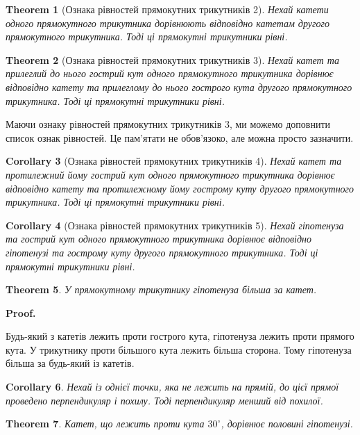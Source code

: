 \documentclass[a4paper, 10pt]{article}
\makeatletter
\theoremstyle{theoremdd}
\newtheorem{theorem}{Theorem}[subsection]
\theoremstyle{theoremdd}
\theoremstyle{theoremdd}
\theoremstyle{theoremdd}
\theoremstyle{theoremdd}
\theoremstyle{theoremdd}
\theoremstyle{theoremdd}
\theoremstyle{theoremdd}
\theoremstyle{theoremdd}
\newtheorem{corollary}[theorem]{Corollary}
\renewenvironment{proof}[1][Proof.\\]{\par
\pushQED{\hfill \qed}%
\normalfont \topsep6\p@\@plus6\p@\relax
\trivlist
\item\relax
{\bfseries
#1\@addpunct{.}}\hspace\labelsep\ignorespaces
}{%
\popQED\endtrivlist\@endpefalse
}
\makeatother
\begin{document}
\begin{theorem}[Ознака рівностей прямокутних трикутників 2]
Нехай катети одного прямокутного трикутника дорівнюють відповідно катетам другого прямокутного трикутника. Тоді ці прямокутні трикутники рівні.
\end{theorem}

\begin{theorem}[Ознака рівностей прямокутних трикутників 3]
Нехай катет та прилеглий до нього гострий кут одного прямокутного трикутника дорівнює відповідно катету та прилеглому до нього гострого кута другого прямокутного трикутника. Тоді ці прямокутні трикутники рівні.
\end{theorem}

Маючи ознаку рівностей прямокутних трикутників 3, ми можемо доповнити список ознак рівностей. Це пам'ятати не обов'язоко, але можна просто зазначити.

\begin{corollary}[Ознака рівностей прямокутних трикутників 4]
Нехай катет та протилежний йому гострий кут одного прямокутного трикутника дорівнює відповідно катету та протилежному йому гострому куту другого прямокутного трикутника. Тоді ці прямокутні трикутники рівні.
\end{corollary}

\begin{corollary}[Ознака рівностей прямокутних трикутників 5]
Нехай гіпотенуза та гострий кут одного прямокутного трикутника дорівнює відповідно гіпотенузі та гострому куту другого прямокутного трикутника. Тоді ці прямокутні трикутники рівні.
\end{corollary}

\begin{theorem}
У прямокутному трикутнику гіпотенуза більша за катет.
\end{theorem}

\begin{proof}
Будь-який з катетів лежить проти гострого кута, гіпотенуза лежить проти прямого кута. У трикутнику проти більшого кута лежить більша сторона. Тому гіпотенуза більша за будь-який із катетів.
\end{proof}

\begin{corollary}
Нехай із однієї точки, яка не лежить на прямій, до цієї прямої проведено перпендикуляр і похилу. Тоді перпендикуляр менший від похилої.
\end{corollary}

\begin{theorem}
Катет, що лежить проти кута $30^\circ$, дорівнює половині гіпотенузі.
\end{theorem}
\end{document}
